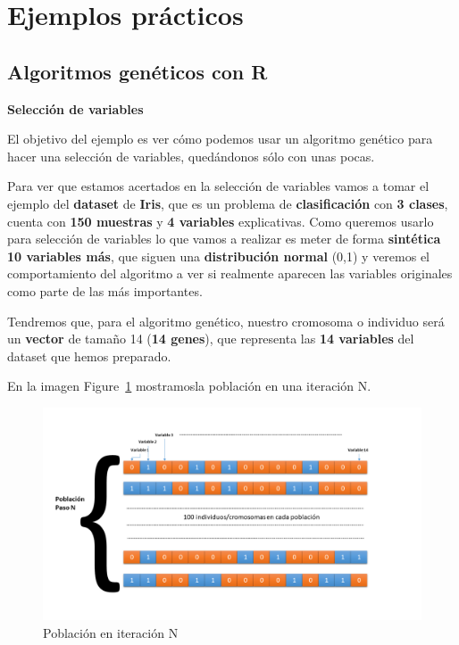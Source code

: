 \documentclass[
  a4paper,
  DIV=11,
  numbers=noendperiod]{scrreprt}
\begin{document}
\hypertarget{ejemplos-pruxe1cticos}{%
\section{Ejemplos prácticos}\label{ejemplos-pruxe1cticos}}

\hypertarget{algoritmos-genuxe9ticos-con-r}{%
\subsection{Algoritmos genéticos con
R}\label{algoritmos-genuxe9ticos-con-r}}

\textbf{Selección de variables}

El objetivo del ejemplo es ver cómo podemos usar un algoritmo genético
para hacer una selección de variables, quedándonos sólo con unas pocas.

Para ver que estamos acertados en la selección de variables vamos a
tomar el ejemplo del \textbf{dataset} de \textbf{Iris}, que es un
problema de \textbf{clasificación} con \textbf{3 clases}, cuenta con
\textbf{150 muestras} y \textbf{4 variables} explicativas. Como queremos
usarlo para selección de variables lo que vamos a realizar es meter de
forma \textbf{sintética} \textbf{10 variables más}, que siguen una
\textbf{distribución normal} (0,1) y veremos el comportamiento del
algoritmo a ver si realmente aparecen las variables originales como
parte de las más importantes.

Tendremos que, para el algoritmo genético, nuestro cromosoma o individuo
será un \textbf{vector} de tamaño 14 (\textbf{14 genes}), que representa
las \textbf{14 variables} del dataset que hemos preparado.

En la imagen Figure~\ref{fig-poblacion} mostramosla población en una
iteración N.

\begin{figure}

{\centering \includegraphics{imagenes/capitulo3/poblacion.png}

}

\caption{\label{fig-poblacion}Población en iteración N}

\end{figure}
\end{document}
